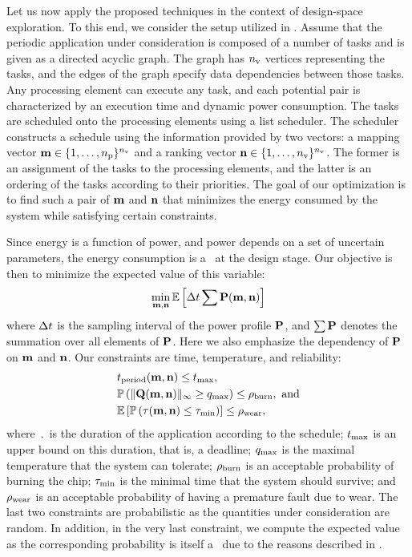 Let us now apply the proposed techniques in the context of design-space exploration.
To this end, we consider the setup utilized in \cite{ukhov2012}.
Assume that the periodic application under consideration is composed of a number of tasks and is given as a directed acyclic graph.
The graph has ${n_\text{v}}$ vertices representing the tasks, and the edges of the graph specify data dependencies between those tasks.
Any processing element can execute any task, and each potential pair is characterized by an execution time and dynamic power consumption.
The tasks are scheduled onto the processing elements using a list scheduler.
The scheduler constructs a schedule using the information provided by two vectors: a mapping vector $\mathbf{m} \in \{ 1, \dotsc, {n_\text{p}} \}^{n_\text{v}}$ and a ranking vector $\mathbf{n} \in \{ 1, \dotsc, {n_\text{v}} \}^{n_\text{v}}$.
The former is an assignment of the tasks to the processing elements, and the latter is an ordering of the tasks according to their priorities.
The goal of our optimization is to find such a pair of $\mathbf{m}$ and $\mathbf{n}$ that minimizes the energy consumed by the system while satisfying certain constraints.

Since energy is a function of power, and power depends on a set of uncertain parameters, the energy consumption is a \rv\ at the design stage.
Our objective is then to minimize the expected value of this variable:
\begin{equation} \elab{objective}
  \min_{\mapping, \priority} \expectation{\dt \sum \mP(\mapping, \priority)}
\end{equation}
where $\Delta t$ is the sampling interval of the power profile $\mathbf{P}$, and $\sum \mathbf{P}$ denotes the summation over all elements of $\mathbf{P}$.
Here we also emphasize the dependency of $\mathbf{P}$ on $\mathbf{m}$ and $\mathbf{n}$.
Our constraints are time, temperature, and reliability:
\begin{align}
  & \period(\mapping, \priority) \leq \t_\maximal, \elab{timing-constraint} \\
  & \probabilityMeasure\left( \norm[\infty]{\mQ(\mapping, \priority)} \geq \q_\maximal \right) \leq \pr_\burn, \text{ and} \elab{thermal-constraint} \\
  & \expectation{\probabilityMeasure\left( \T(\mapping, \priority) \leq \T_\minimal \right)} \leq \pr_\wear, \elab{reliability-constraint}
\end{align}
where $\period$ is the duration of the application according to the schedule; $t_{\text{max}}$ is an upper bound on this duration, that is, a deadline; $q_{\text{max}}$ is the maximal temperature that the system can tolerate; $\rho_{\text{burn}}$ is an acceptable probability of burning the chip; $\tau_{\text{min}}$ is the minimal time that the system should survive; and $\rho_{\text{wear}}$ is an acceptable probability of having a premature fault due to wear.
The last two constraints are probabilistic as the quantities under consideration are random.
In addition, in the very last constraint, we compute the expected value as the corresponding probability is itself a \rv\ due to the reasons described in .

